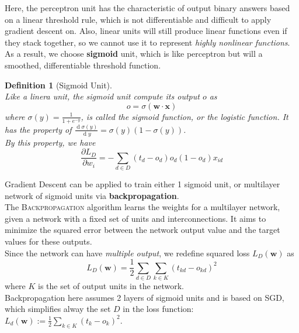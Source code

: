 \documentclass[12pt]{article}
\newtheorem{definition}{Definition}[section]
\theoremstyle{definition}
\DeclareMathOperator{\diff}{d}
\begin{document}
Here, the perceptron unit has the characteristic of output binary answers based on a linear threshold rule, which is not differentiable and difficult to apply gradient descent on. Also, linear units will still produce linear functions even if they stack together, so we cannot use it to represent \textit{highly nonlinear functions}. As a result, we choose \textbf{sigmoid} unit, which is like perceptron but will a smoothed, differentiable threshold function.
\begin{definition}[Sigmoid Unit]
\hfill\\\normalfont Like a linera unit, the sigmoid unit compute its output $o$ as 
\[
o=\sigma(\mathbf{w}\cdot\mathbf{x})
\]
where $\sigma(y)=\frac{1}{1+e^{-y}}$, is called the sigmoid function, or the logistic function. It has the property of $\frac{\diff \sigma(y)}{\diff y}=\sigma(y)(1-\sigma(y))$.\\
By this property, we have 
\[
\frac{\partial L_D}{\partial w_i}=-\sum_{d\in D}(t_d-o_d)o_d(1-o_d)x_{id}
\]
\end{definition}
Gradient Descent can be applied to train either 1 sigmoid unit, or multilayer network of sigmoid units via \textbf{backpropagation}.\\
The \textsc{Backpropagation} algorithm learns the weights for a multilayer network, given a network with a fixed set of units and interconnections. It aims to minimize the squared error between the network output value and the target values for these outputs.\\
Since the network can have \textit{multiple output}, we redefine squared loss $L_D(\mathbf{w})$ as
\[
L_D(\mathbf{w})=\frac{1}{2}\sum_{d\in D}\sum_{k\in K}(t_{kd}-o_{kd})^2
\]
where $K$ is the set of output units in the network.\\
Backpropagation here assumes 2 layers of sigmoid units and is based on SGD, which simplifies alway the set $D$ in the loss function: $L_d(\mathbf{w}):=\frac{1}{2}\sum_{k\in K}(t_k-o_k)^2$.
\end{document}
